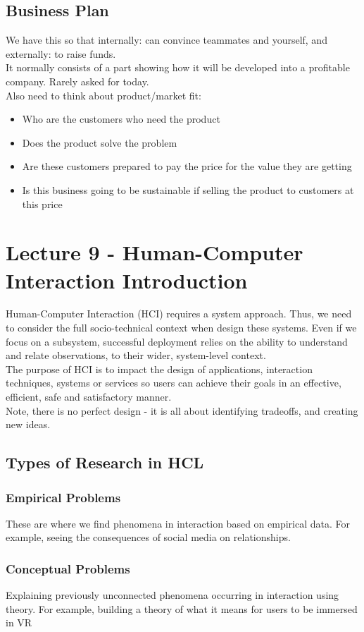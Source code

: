 \documentclass{article}
\begin{document}
\subsection{Business Plan}
We have this so that internally: can convince teammates and yourself, and externally: to raise funds. \\ It normally consists of a part showing how it will be developed into a profitable company. Rarely asked for today. \\
Also need to think about product/market fit:
\begin{itemize}
    \item Who are the customers who need the product
    \item Does the product solve the problem
    \item Are these customers prepared to pay the price for the value they are getting
    \item Is this business going to be sustainable if selling the product to customers at this price
\end{itemize}
\section{Lecture 9 - Human-Computer Interaction Introduction}
Human-Computer Interaction (HCI) requires a system approach. Thus, we need to consider the full socio-technical context when design these systems. Even if we focus on a subsystem, successful deployment relies on the ability to understand and relate observations, to their wider, system-level context. \\ The purpose of HCI is to impact the design of applications, interaction techniques, systems or services so users can achieve their goals in an effective, efficient, safe and satisfactory manner. \\
Note, there is no perfect design - it is all about identifying tradeoffs, and creating new ideas. \subsection{Types of Research in HCL}
\subsubsection*{Empirical Problems}
These are where we find phenomena in interaction based on empirical data. For example, seeing the consequences of social media on relationships. 
\subsubsection*{Conceptual Problems}
Explaining previously unconnected phenomena occurring in interaction using theory. For example, building a theory of what it means for users to be immersed in VR
\end{document}
